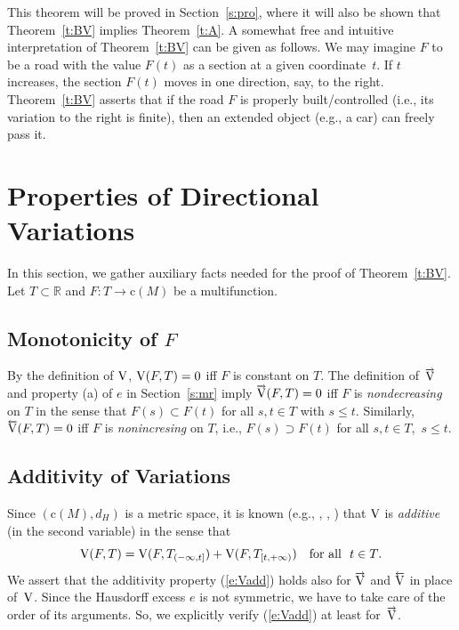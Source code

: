 \documentclass[preprint,12pt]{elsarticle}
\newcommand{\eq}[1]{\mbox{\rm(\ref{#1})}}
\newcommand{\Rb}{\mathbb{R}}  \newcommand{\Nb}{\mathbb{N}}
\newcommand{\nV}{\mbox{\rm V}}
\newcommand{\riV}{{\scriptstyle\overrightarrow{\mbox{\rm V}}}}
\newcommand{\leV}{{\scriptstyle\overleftarrow{\mbox{\rm V}}}}
\begin{document}
This theorem will be proved in Section~\ref{s:pro}, where it will also be shown that
Theorem~\ref{t:BV} implies Theorem~\ref{t:A}.
A somewhat free and intuitive interpretation of Theorem~\ref{t:BV} can be given as
follows. We may imagine $F$ to be a road with the value $F(t)$ as a section at a given
coordinate~$t$. If $t$ increases, the section $F(t)$ moves in one direction, say, to the
right. Theorem~\ref{t:BV} asserts that if the road $F$ is properly built/controlled
(i.e., its variation to the right is finite), then an extended object (e.g., a car) can
freely pass it.

\section{Properties of Directional Variations} \label{s:dirvar}

In this section, we gather auxiliary facts needed for the proof of Theorem~\ref{t:BV}.
Let $T\subset\Rb$ and $F:T\to\mbox{c}(M)$ be a multifunction.

\subsection{Monotonicity of $F$} \label{ss:mon}

By the definition of $\nV$, $\nV(F,T)=0$ iff $F$ is constant on $T$. The definition of~$\riV$
and property (a) of $e$ in Section~\ref{s:mr} imply $\riV(F,T)=0$ iff $F$ is
\emph{nondecreasing\/} on $T$ in the sense that $F(s)\subset F(t)$ for all $s,t\in T$
with $s\le t$. Similarly, $\leV(F,T)=0$ iff $F$ is \emph{nonincresing\/} on $T$, i.e.,
$F(s)\supset F(t)$ for all $s,t\in T$,~$s\le t$.

\subsection{Additivity of Variations}

Since $(\mbox{c}(M),d_H)$ is a metric space, it is known (e.g., \cite[2.19]{Var},
\cite{JDCS}, \cite{MatSb}) that $\nV$ is \emph{additive\/} (in the second variable)
in the sense that
  \begin{equation} \label{e:Vadd}
\nV(F,T)=\nV(F,T_{(-\infty,t]})+\nV(F,T_{[t,+\infty)})\quad\mbox{for all \,\,$t\in T$.}
  \end{equation}
We assert that the additivity property \eq{e:Vadd} holds also for $\riV$ and $\leV$
in place of~$\nV$. Since the Hausdorff excess $e$ is not symmetric, we have to take
care of the order of its arguments. So, we explicitly verify \eq{e:Vadd} at least for~$\riV$.
\end{document}
